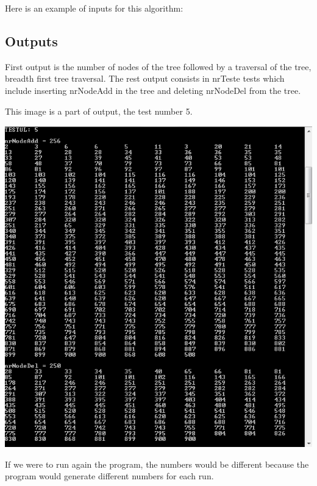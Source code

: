 \documentclass{article}
\begin{document}
Here is an example of inputs for this algorithm:

\subsection{Outputs}

First output is the number of nodes of the tree followed by a traversal of the tree, breadth first tree traversal. The rest output consists in nrTeste tests which include inserting nrNodeAdd in the tree and deleting nrNodeDel from the tree.

This image is a part of output, the test number 5. 

\includegraphics[scale=0.69]{test5}

If we were to run again the program, the numbers would be different because the program would generate different numbers for each run.

\indent \indent \indent  \indent
\end{document}

